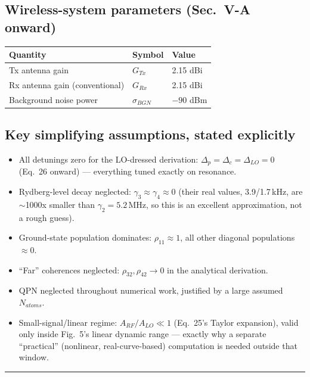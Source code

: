 \documentclass[11pt]{article}
\begin{document}
\subsection*{Wireless-system parameters (Sec.~V-A onward)}
\begin{center}
\begin{tabular}{@{}lll@{}}
\toprule
Quantity & Symbol & Value \\ \midrule
Tx antenna gain & $G_{Tx}$ & 2.15 dBi \\
Rx antenna gain (conventional) & $G_{Rx}$ & 2.15 dBi \\
Background noise power & $\sigma_{BGN}$ & $-90$ dBm \\
\bottomrule
\end{tabular}
\end{center}

\subsection*{Key simplifying assumptions, stated explicitly}
\begin{itemize}[nosep]
\item All detunings zero for the LO-dressed derivation: $\Delta_p=\Delta_c=\Delta_{LO}=0$ (Eq.~26 onward) --- everything tuned exactly on resonance.
\item Rydberg-level decay neglected: $\gamma_3\approx\gamma_4\approx0$ (their real values, 3.9/1.7\,kHz, are $\sim$1000x smaller than $\gamma_2=5.2$\,MHz, so this is an excellent approximation, not a rough guess).
\item Ground-state population dominates: $\rho_{11}\approx1$, all other diagonal populations $\approx0$.
\item ``Far'' coherences neglected: $\rho_{32},\rho_{42}\to0$ in the analytical derivation.
\item QPN neglected throughout numerical work, justified by a large assumed $N_{atoms}$.
\item Small-signal/linear regime: $A_{RF}/A_{LO}\ll1$ (Eq.~25's Taylor expansion), valid only inside Fig.~5's linear dynamic range --- exactly why a separate ``practical'' (nonlinear, real-curve-based) computation is needed outside that window.
\end{itemize}

\newpage
\noindent\rule{\linewidth}{1.6pt}\par\vspace{2pt}
\end{document}
